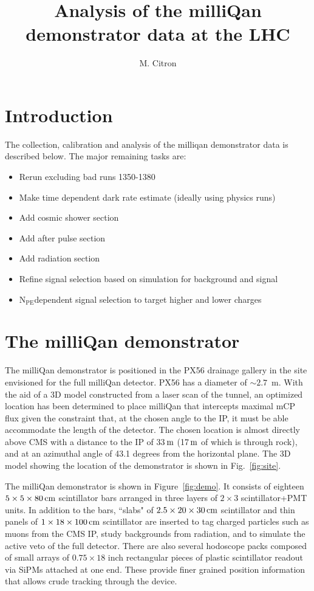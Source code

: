\documentclass[12pt]{article}
\title{Analysis of the milliQan demonstrator data at the LHC}
\author{M. Citron}
\newcommand{\unit}[1]{\ensuremath{\text{\,#1}}\xspace}
\newcommand{\npe} {\mbox{\ensuremath{\textrm{N}_\textrm{PE}}\xspace}}
\begin{document}
\maketitle

\section{Introduction}

The collection, calibration and analysis of the milliqan demonstrator data is described below.
The major remaining tasks are:
\begin{itemize}
    \item Rerun excluding bad runs 1350-1380
    \item Make time dependent dark rate estimate (ideally using physics runs)
    \item Add cosmic shower section
    \item Add after pulse section
    \item Add radiation section
    \item Refine signal selection based on simulation for background and signal
    \item \npe dependent signal selection to target higher and lower charges
\end{itemize}

\section{The milliQan demonstrator}

The milliQan demonstrator is positioned in the PX56 drainage gallery in
the site envisioned for the full milliQan detector. PX56 has a diameter of $\sim 2.7$~m. 
With the aid of a 3D model constructed from a laser scan of the tunnel, 
an optimized location has been determined to place milliQan 
that intercepts maximal mCP flux given the constraint that, at the 
chosen angle to the IP, it must be able accommodate the length of the detector. 
The chosen location is almost directly above CMS with a distance to the IP of 
33\unit{m} (17\unit{m} of which is through rock), and at an azimuthal angle of 
43.1 degrees from the horizontal plane. The 3D model showing the location 
of the demonstrator is shown in Fig.~\ref{fig:site}.

The milliQan demonstrator is shown in Figure~\ref{fig:demo}. It
consists of eighteen $5\times5\times80\unit{cm}$ scintillator bars arranged in three layers of 
$2\times3$ scintillator+PMT units. In addition to the bars, ``slabs" of $2.5 \times 20 \times 30\unit{cm}$ 
scintillator and thin panels of $1 \times 18 \times 100\unit{cm}$ scintillator are 
inserted to tag charged particles such as muons from the CMS IP, study backgrounds 
from radiation, and to simulate the active veto of the full detector. There are also 
several hodoscope packs composed of small arrays of $0.75 \times 18$ inch rectangular 
pieces of plastic scintillator readout via SiPMs attached at one end. These provide 
finer grained position information that allows crude tracking through the device. 
\end{document}

